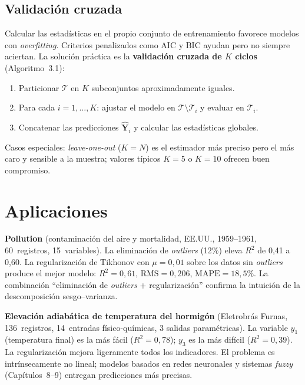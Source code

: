 \subsection{Validación cruzada}

Calcular las estadísticas en el propio conjunto de entrenamiento
favorece modelos con \emph{overfitting}. Criterios penalizados como
AIC y BIC ayudan pero no siempre aciertan. La solución práctica es la
\textbf{validación cruzada de $K$ ciclos} (Algoritmo~3.1):

\begin{enumerate}[leftmargin=1.2cm]
  \item Particionar $\mathcal{T}$ en $K$ subconjuntos
        aproximadamente iguales.
  \item Para cada $i=1,\dots,K$: ajustar el modelo en
        $\mathcal{T}\setminus\mathcal{T}_i$ y evaluar en
        $\mathcal{T}_i$.
  \item Concatenar las predicciones $\hat{\mathbf{Y}}_i$ y calcular las
        estadísticas globales.
\end{enumerate}

Casos especiales: \emph{leave-one-out} ($K=N$) es el estimador más
preciso pero el más caro y sensible a la muestra; valores típicos
$K=5$ o $K=10$ ofrecen buen compromiso.

\section{Aplicaciones}

\begin{aplicacao}
\textbf{Pollution} (contaminación del aire y mortalidad, EE.UU.,
1959--1961, 60~registros, 15~variables). La eliminación de
\emph{outliers} (12\%) eleva $R^2$ de 0{,}41 a 0{,}60. La regularización
de Tikhonov con $\mu=0{,}01$ sobre los datos sin \emph{outliers} produce
el mejor modelo: $R^2=0{,}61$, $\mathrm{RMS}=0{,}206$,
$\mathrm{MAPE}=18{,}5\%$. La combinación ``eliminación de
\emph{outliers} + regularización'' confirma la intuición de la
descomposición sesgo--varianza.
\end{aplicacao}

\begin{aplicacao}
\textbf{Elevación adiabática de temperatura del hormigón}
(Eletrobrás Furnas, 136~registros, 14~entradas físico-químicas, 3
salidas paramétricas). La variable $y_1$ (temperatura final) es la más
fácil ($R^2=0{,}78$); $y_3$ es la más difícil ($R^2=0{,}39$). La
regularización mejora ligeramente todos los indicadores. El problema
es intrínsecamente no lineal; modelos basados en redes neuronales y
sistemas \emph{fuzzy} (Capítulos~8--9) entregan predicciones más
precisas.
\end{aplicacao}

